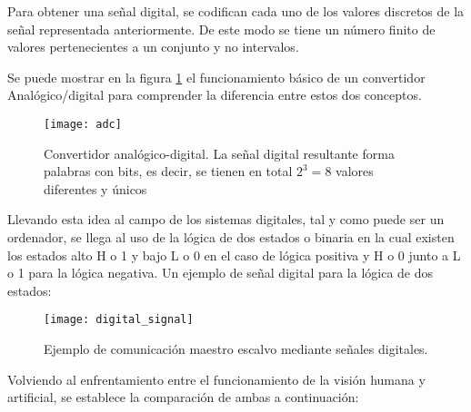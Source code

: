 \begin{itemize}
Para obtener una señal digital, se codifican cada uno de los valores discretos de la señal representada anteriormente. De este modo se tiene un número finito de valores pertenecientes a un conjunto y no intervalos.

Se puede mostrar en la figura \ref{fig:adc} el funcionamiento básico de un convertidor Analógico/digital para comprender la diferencia entre estos dos conceptos.

\begin{figure}[!htb]
\centering
{}
  \texttt{[image: adc]}
  \caption{Convertidor analógico-digital. La señal digital resultante forma palabras con  bits, es decir, se tienen en total $2^3=8$  valores diferentes y únicos}\label{fig:adc}
\endminipage\hfill
\end{figure}

Llevando esta idea al campo de los sistemas digitales, tal y como puede ser un ordenador, se llega al uso de la lógica de dos estados o binaria en la cual existen los estados alto H o 1 y bajo L o 0 en el caso de lógica positiva y H o 0 junto a L o 1 para la lógica negativa.
Un ejemplo de señal digital para la lógica de dos estados:

\begin{figure}[!htb]
\centering
{}
  \texttt{[image: digital\_signal]}
  \caption{Ejemplo de comunicación maestro escalvo mediante señales digitales.}\label{fig:digital_signal}
\endminipage\hfill
\end{figure}

\end{itemize}


Volviendo al enfrentamiento entre el funcionamiento de la visión humana y artificial, se establece la comparación de ambas a continuación:

